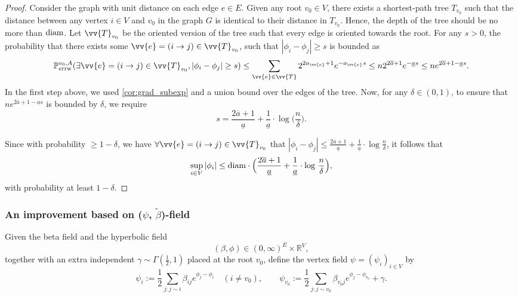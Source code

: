 \documentclass[a4paper, 11pt]{article}
\renewcommand{\P}{\mathbb{P}}
\newcommand{\Perrw}{\P_{\textnormal{errw}}}
\newcommand{\diam}{\textnormal{diam}}
\begin{document}
\begin{proof}
Consider the graph with unit distance on each edge \( e \in E \). Given any root $v_0\in V$, there exists a shortest-path tree \( T_{v_0} \) such that the distance between any vertex $i\in V$ and $v_0$ in the graph $G$ is identical to their distance in $T_{v_0}$. Hence, the depth of the tree should be no more than $\diam$. Let $\vv{T}_{v_0}$ be the oriented version of the tree such that every edge is oriented towards the root. For any $s>0$, the probability that there exists some $\vv{e} = (i \to j) \in \vv{T}_{v_0}$, such that $|\phi_i - \phi_j| \geq s$ is  bounded as
\begin{equation}    \label{eqn:interbound}
\Perrw^{v_0,A}(\exists \vv{e} = (i \to j) \in \vv{T}_{v_0}, |\phi_i - \phi_j| \geq s) \leq \sum_{\vv{e} \in \vv{T}} 2^{2 a_{\vv{e}} + 1} e^{-a_{\vv{e}} s} \leq n 2^{2 \overline{a} + 1} e^{- \underline{a} s}\leq n e^{2 \overline{a} + 1 - \underline{a} s}.
\end{equation}
In the first step above, we used \cref{cor:grad_subexp} and a union bound over the edges of the tree. Now, for any \( \delta \in (0,1) \), to ensure that $n e^{2 \overline{a} + 1 - \underline{a} s}$ is bounded by \( \delta \), we require
\[
s = \frac{2\overline{a}+1}{\underline{a}}+\frac{1}{\underline{a}}\cdot\log\Big(\frac{n}{\delta}\Big).
\]

Since with probability $\geq 1-\delta$, we have \( \forall \vv{e} = (i \to j) \in \vv{T}_{v_0}\) that \(|\phi_i - \phi_j| \leq \frac{2\overline{a}+1}{\underline{a}}+\frac{1}{\underline{a}}\cdot\log \frac{n}{\delta} \), it follows that
\[
\sup_{i \in V} |\phi_i| \leq \diam\cdot \Big(\frac{2\overline{a}+1}{\underline{a}}+\frac{1}{\underline{a}}\cdot \log\,\frac{n}{\delta}\Big),
\]
with probability at least \( 1 - \delta \).
\end{proof}


\subsubsection{An improvement based on ($\psi$, $\tilde \beta$)-field}

Given the beta field and the hyperbolic field
\[
(\beta,\phi)\in (0,\infty)^E\times \mathbb{R}^{V},
\]
together with an extra independent $\gamma\sim\Gamma(\tfrac12,1)$ placed at the root $v_0$, define the vertex field $\psi=(\psi_i)_{i\in V}$ by
\begin{equation}\label{eqn:psi}
\psi_{i}:=\frac12\sum_{j:j\sim i}\beta_{ij}e^{\phi_j-\phi_i}\quad (i\neq v_0),
\qquad
\psi_{v_0}:=\frac12\sum_{j:j\sim v_0}\beta_{v_0j}e^{\phi_j-\phi_{v_0}}+\gamma.
\end{equation}
\end{document}
